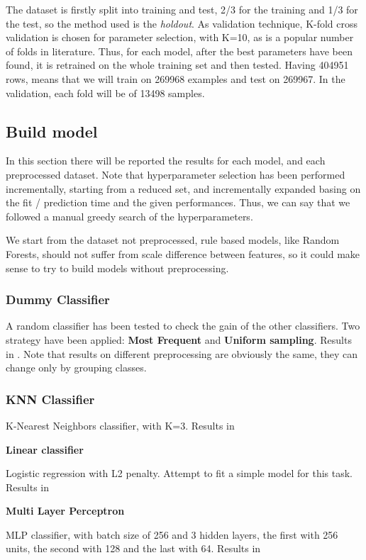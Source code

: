 The dataset is firstly split into training and test, 2/3 for the training and 1/3 for the test, so the method used is the \textit{holdout}. 
As validation technique, K-fold cross validation is chosen for parameter selection, with K=10, as is a popular number of folds in literature.
Thus, for each model, after the best parameters have been found, it is retrained on the whole training set and then tested.
Having 404951 rows, means that we will train on 269968 examples and test on 269967. In the validation, each fold will be of 13498 samples.

\subsection{Build model}

In this section there will be reported the results for each model, and each preprocessed dataset.
Note that hyperparameter selection has been performed incrementally, starting from a reduced set, and incrementally expanded basing on the fit / prediction time and the given performances. 
Thus, we can say that we followed a manual greedy search of the hyperparameters.

\note{}
We start from the dataset not preprocessed, rule based models, like Random Forests, should not suffer from scale difference between features, so it could make sense to try to build models without preprocessing.

\subsubsection{Dummy Classifier}

A random classifier has been tested to check the gain of the other classifiers. Two strategy have been applied: \textbf{Most Frequent} and \textbf{Uniform sampling}. Results in .
Note that results on different preprocessing are obviously the same, they can change only by grouping classes.



\subsubsection{KNN Classifier}

K-Nearest Neighbors classifier, with K=3. Results in 



\textbf{Linear classifier}

Logistic regression with L2 penalty. Attempt to fit a simple model for this task. Results in 




\textbf{Multi Layer Perceptron}

MLP classifier, with batch size of 256 and 3 hidden layers, the first with 256 units, the second with 128 and the last with 64. Results in 

